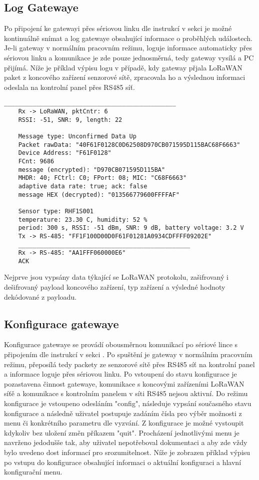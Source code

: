 \subsection{Log Gatewaye}
Po připojení ke gatewayi přes sériovou linku dle instrukcí v sekci  je možné kontinuálně snímat a log gatewaye obsahující informace o proběhlých událostech. Je-li gateway v normálním pracovním režimu, loguje informace automaticky přes sériovou linku a komunikace je zde pouze jednosměrná, tedy gateway vysílá a PC přijímá.
Níže je příklad výpisu logu v případě, kdy gateway přjala LoRaWAN paket z koncového zařízení senzorové sítě, zpracovala ho a výslednou informaci odeslala na kontrolní panel přes RS485 síť.

\newpage
\begin{lstlisting}[style=CStyle]
    ________________________________________________
    Rx -> LoRaWAN, pktCntr: 6
    RSSI: -51, SNR: 9, length: 22

    Message type: Unconfirmed Data Up
    Packet rawData: "40F61F0128C0D62508D970CB071595D115BAC68F6663"
    Device Address: "F61F0128"
    FCnt: 9686
    message (encrypted): "D970CB071595D115BA"
    MHDR: 40; FCtrl: C0; FPort: 08; MIC: "C68F6663"
    adaptive data rate: true; ack: false
    message HEX (decrypted): "013566779600FFFFAF"

    Sensor type: RHF1S001
    temperature: 23.30 C, humidity: 52 %
    period: 300 s, RSSI: -51 dBm, SNR: 9 dB, battery voltage: 3.2 V
    Tx -> RS-485: "FF1F100D00D0F61F01281A0934CDFFFF09202E"
    ________________________________________________
    Rx -> RS-485: "AA1FFF060000E6"
    ACK
\end{lstlisting}

Nejprve jsou vypsány data týkající se LoRaWAN protokolu, zašifrovaný i dešifrovaný payload koncového zařízení, typ zařízení a výsledné hodnoty dekódované z payloadu.


\subsection{Konfigurace gatewaye}
\label{Konfigurace gatewaye}
Konfigurace gatewaye se provádí obousměrnou komunikací po sériové lince s připojením dle instrukcí v sekci .
Po spuštění je gateway v normálním pracovním režimu, přeposílá tedy packety ze senzorové sítě přes RS485 síť na kontrolní panel a informace loguje přes sériovou linku.
Po vstoupení do stavu konfigurace je pozastavena činnost gatewaye, komunikace s koncovými zařízeními LoRaWAN síťě a komunikace s kontrolním panelem v síti RS485 nejsou aktivní.
Do režimu konfigurace je vstoupeno odesláním "config", následuje vypsání současného stavu konfigurace a následně uživatel postupuje zadáním čísla pro výběr možnosti z menu či konkrétního parametru dle vyzvání. Z konfigurace je možné vystoupit kdykoliv bez uložení změn příkazem "quit". 
Procházení jednotlivými menu je navrženo jedodušše tak, aby uživatel nepotřeboval dokumentaci a aby zde vždy bylo uvedeno dost informací pro srozumitelnost.
Níže je zobrazen příklad výpisu po vstupu do konfigurace obsahující informaci o aktuální konfiguraci a hlavní konfigurační menu.


